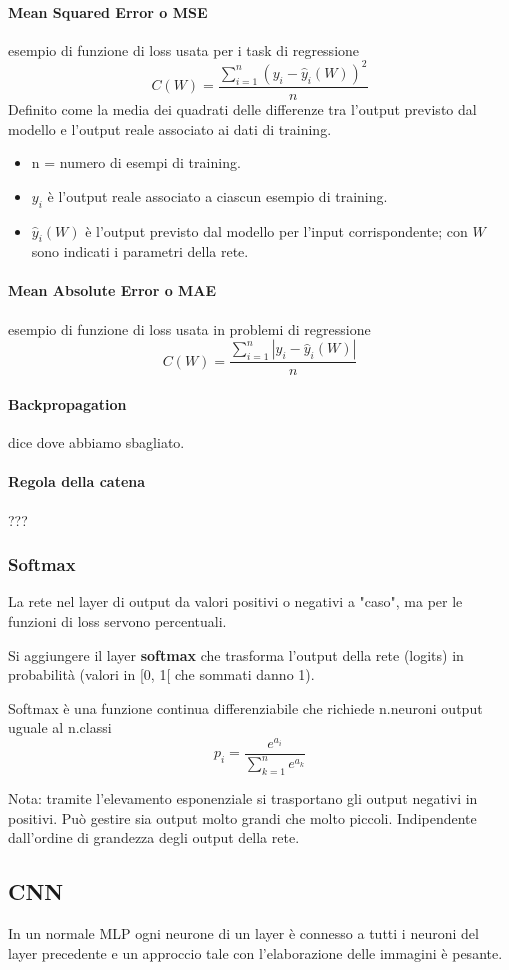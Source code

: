 \paragraph{Mean Squared Error o MSE} esempio di funzione di loss usata per i task di regressione \[C(W)=\frac{\sum_{i=1}^n(y_i-\hat{y}_i(W))^2}{n}\] Definito come la media dei quadrati delle differenze tra l'output previsto dal modello e l'output reale associato ai dati di training.
\begin{itemize}
	\item n = numero di esempi di training.
	\item $y_i$ è l'output reale associato a ciascun esempio di training.
	\item $\hat{y}_i(W)$ è l'output previsto dal modello per l'input corrispondente; con $W$ sono indicati i parametri della rete.
\end{itemize}
\paragraph{Mean Absolute Error o MAE} esempio di funzione di loss usata in problemi di regressione \[C(W)=\frac{\sum_{i=1}^n|y_i-\hat{y}_i(W)|}{n}\]
\paragraph{Backpropagation} dice dove abbiamo sbagliato.
\paragraph{Regola della catena} ???
\subsubsection{Softmax}
La rete nel layer di output da valori positivi o negativi a "caso", ma per le funzioni di loss servono percentuali.

Si aggiungere il layer \textbf{softmax} che trasforma l'output della rete (logits) in probabilità (valori in [0, 1[  che sommati danno 1).

Softmax è una funzione continua differenziabile che richiede n.neuroni output uguale al n.classi \[p_i=\frac{e^{a_i}}{\sum_{k=1}^ne^{a_k}}\]

Nota: tramite l'elevamento esponenziale si trasportano gli output negativi in positivi. Può gestire sia output molto grandi che molto piccoli. Indipendente dall'ordine di grandezza degli output della rete.
\subsection{CNN}
In un normale MLP ogni neurone di un layer è connesso a tutti i neuroni del layer precedente e un approccio tale con l'elaborazione delle immagini è pesante.


